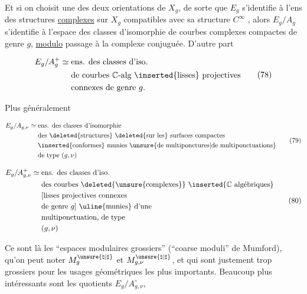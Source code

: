Et si on choisit une des deux orientations de \(X_g\), de sorte que \(E_g\) s'identifie à l'ens des structures \uline{complexes} sur \(X_g\) compatibles avec sa structure \(C^\infty\) , alors \(E_g/A_g\) s'identifie à l'espace des classes d'isomorphie de courbes complexes  compactes de genre \(g\), \uline{modulo} passage à la complexe conjuguée. D'autre part


\[
 \begin{aligned}
 E_g/A_g^+\simeq{}&\text{ens. des classes d'iso.}\\
 &\text{de courbes }\mathbb C\text{-alg \inserted{lisses} projectives}\\
 &\text{connexes de genre }g.
 \end{aligned}
 \tag{78}
\]

Plus généralement

\[
 \begin{aligned}
 E_g/A_{g,\nu}\simeq{}&\text{ens. des classes d'isomorphie}\\
 &\text{des \deleted{structures} \deleted{sur les} surfaces compactes}\\
 &\text{\inserted{conformes} munies \unsure{de multiponctures|de multiponctuations}}\\
 &\text{de type }(g,\nu)
 \end{aligned}
 \tag{79}
\]

\[
 \begin{aligned}
 E_g/A_{g,\nu}^{+}\simeq{}&\text{ens. des classes d'iso.}\\
 &\text{des courbes \deleted{\unsure{complexes}} \inserted{\(\mathbb C\) algébriques}}\\
 &\text{[lisses projectives connexes}\\
 &\text{de genre }g\text{] \uline{munies} d'une}\\
 &\text{multiponctuation, de type}\\
 &(g,\nu)
 \end{aligned}
 \tag{80}
\]

Ce sont là les ``espaces modulaires grossiers'' (``coarse moduli'' de Mumford), qu'on peut noter \(M_g^{\unsure{\natural|\sharp}}\) et \(M_{g,\nu}^{\unsure{\natural|\sharp}}\), et qui sont justement trop grossiers pour les usages géométriques les plus importants.  Beaucoup plus intéressants sont les quotients \(E_g/A_{g,\nu}^{\circ}\), 

